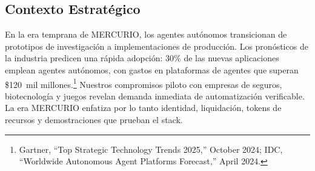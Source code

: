 \documentclass[11pt]{article}
\begin{document}
\subsection{Contexto Estratégico}
En la era temprana de MERCURIO, los agentes autónomos transicionan de prototipos de investigación a implementaciones de producción. Los pronósticos de la industria predicen una rápida adopción: 30\% de las nuevas aplicaciones emplean agentes autónomos, con gastos en plataformas de agentes que superan \$120~mil millones.\footnote{Gartner, ``Top Strategic Technology Trends 2025,'' October 2024; IDC, ``Worldwide Autonomous Agent Platforms Forecast,'' April 2024.} Nuestros compromisos piloto con empresas de seguros, biotecnología y juegos revelan demanda inmediata de automatización verificable. La era MERCURIO enfatiza por lo tanto identidad, liquidación, tokens de recursos y demostraciones que prueban el stack.
\end{document}
